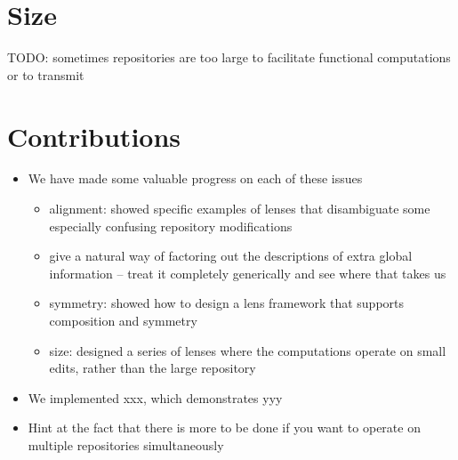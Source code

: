 \section{Size}
\label{sec:intro-size}
TODO: sometimes repositories are too large to facilitate functional
computations or to transmit

\section{Contributions}
\label{sec:intro-contributions}
\begin{itemize}
    \item We have made some valuable progress on each of these issues
        \begin{itemize}
            \item alignment: showed specific examples of lenses that
                disambiguate some especially confusing repository
                modifications
            \item give a natural way of factoring out the descriptions of
                extra global information -- treat it completely generically
                and see where that takes us
            \item symmetry: showed how to design a lens framework that
                supports composition and symmetry
            \item size: designed a series of lenses where the computations
                operate on small edits, rather than the large repository
        \end{itemize}
    \item We implemented xxx, which demonstrates yyy
    \item Hint at the fact that there is more to be done if you want to
        operate on multiple repositories simultaneously
\end{itemize}
